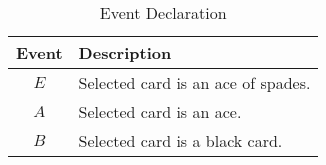 \begin{table}[H]
\centering
\def\arraystretch{1.5}
\begin{tabular}{|c|l|}
\hline
\textbf{Event} & \textbf{Description} \\ \hline 
$E$ & Selected card is an ace of spades.\\ \hline
$A$ & Selected card is an ace. \\ \hline
$B$ & Selected card is a black card.\\ \hline
\end{tabular}
\label{tab: table 1}
\caption{Event Declaration}
\end{table}
